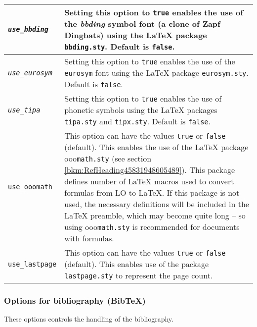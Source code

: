 \documentclass{article}
\newcommand\textstyleSourceText[1]{\texttt{\textmd{#1}}}
\begin{document}
\begin{center}
\begin{tabular}{|m{3.425cm}|m{13.188cm}|}
{\mdseries \textstyleSourceText{\emph{use\_bbding}}} &
{\mdseries Setting this option to \textstyleSourceText{true} enables the use of the \emph{bbding} symbol font (a clone of Zapf Dingbats) using the LaTeX package \textstyleSourceText{bbding.sty}. Default is \textstyleSourceText{false}.}\\\hline
{\mdseries \textstyleSourceText{\emph{use\_eurosym}}} &
{\mdseries Setting this option to \textstyleSourceText{true} enables the use of  the \textstyleSourceText{eurosym} font using the LaTeX package \textstyleSourceText{eurosym.sty}. Default is \textstyleSourceText{false}.}\\\hline
{\mdseries \textstyleSourceText{\emph{use\_tipa}}} &
{\mdseries Setting this option to \textstyleSourceText{true} enables the use of phonetic symbols using the LaTeX packages \textstyleSourceText{tipa.sty} and \textstyleSourceText{tipx.sty}. Default is \textstyleSourceText{false}.}\\\hline
{\mdseries \textstyleSourceText{use\_ooomath}} &
{\mdseries This option can  have the values \textstyleSourceText{true} or \textstyleSourceText{false} (default). This enables the use of the LaTeX package ooo\textstyleSourceText{math.sty} (see section \ref{bkm:RefHeading45831948605489}). This package defines  number of LaTeX macros used to convert formulas from LO to LaTeX. If this package is not used, the necessary definitions will be included in the LaTeX preamble, which may become quite long -- so using ooo\textstyleSourceText{math.sty} is recommended for documents with formulas.}\\\hline
{\mdseries \textstyleSourceText{use\_lastpage}} &
{\mdseries This option can have the values \textstyleSourceText{true} or \textstyleSourceText{false} (default). This enables use of the package \textstyleSourceText{lastpage.sty} to represent the page count.}\\\hline
\end{tabular}
\end{center}
\subsubsection{Options for bibliography (BibTeX)}
{\mdseries
These options controls the handling of the bibliography.}
\end{document}

